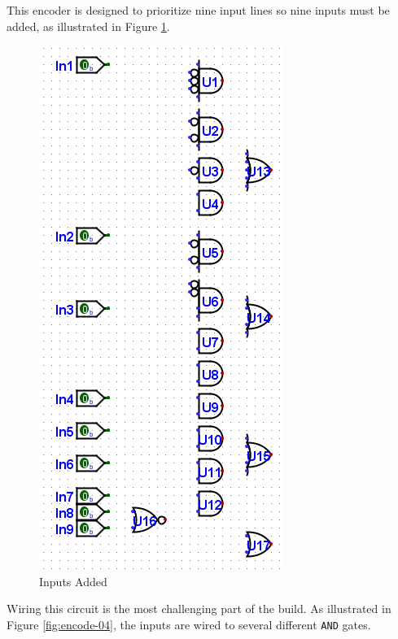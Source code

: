 This encoder is designed to prioritize nine input lines so nine inputs must be added, as illustrated in Figure \ref{fig:encode-03}.

\begin{figure}[H]
	\centering
	\includegraphics[width=\maxwidth{.95\linewidth}]{gfx/encode-03}
	\caption{Inputs Added}
	\label{fig:encode-03}
\end{figure}

Wiring this circuit is the most challenging part of the build. As illustrated in Figure \ref{fig:encode-04}, the inputs are wired to several different \texttt{AND} gates.

